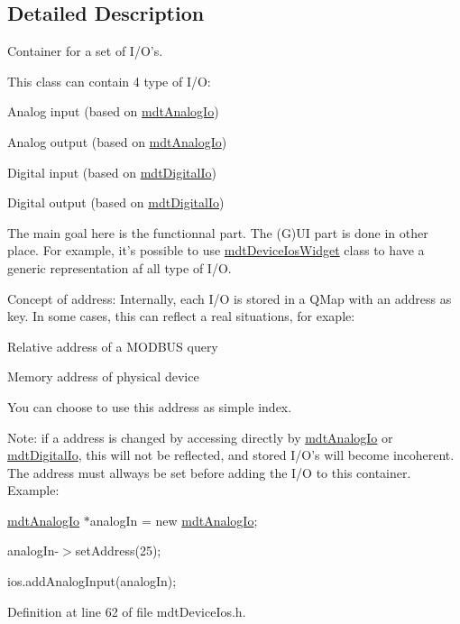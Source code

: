 \subsection{Detailed Description}
Container for a set of I/O's. 

This class can contain 4 type of I/O:
\begin{DoxyItemize}
\item Analog input (based on \hyperlink{classmdt_analog_io}{mdtAnalogIo})
\item Analog output (based on \hyperlink{classmdt_analog_io}{mdtAnalogIo})
\item Digital input (based on \hyperlink{classmdt_digital_io}{mdtDigitalIo})
\item Digital output (based on \hyperlink{classmdt_digital_io}{mdtDigitalIo})
\end{DoxyItemize}

The main goal here is the functionnal part. The (G)UI part is done in other place. For example, it's possible to use \hyperlink{classmdt_device_ios_widget}{mdtDeviceIosWidget} class to have a generic representation af all type of I/O.

Concept of address: Internally, each I/O is stored in a QMap with an address as key. In some cases, this can reflect a real situations, for exaple:
\begin{DoxyItemize}
\item Relative address of a MODBUS query
\item Memory address of physical device
\end{DoxyItemize}

You can choose to use this address as simple index.

Note: if a address is changed by accessing directly by \hyperlink{classmdt_analog_io}{mdtAnalogIo} or \hyperlink{classmdt_digital_io}{mdtDigitalIo}, this will not be reflected, and stored I/O's will become incoherent. The address must allways be set before adding the I/O to this container. Example:
\begin{DoxyItemize}
\item \hyperlink{classmdt_analog_io}{mdtAnalogIo} $\ast$analogIn = new \hyperlink{classmdt_analog_io}{mdtAnalogIo};
\item analogIn-\/$>$setAddress(25);
\item ios.addAnalogInput(analogIn); 
\end{DoxyItemize}

Definition at line 62 of file mdtDeviceIos.h.



